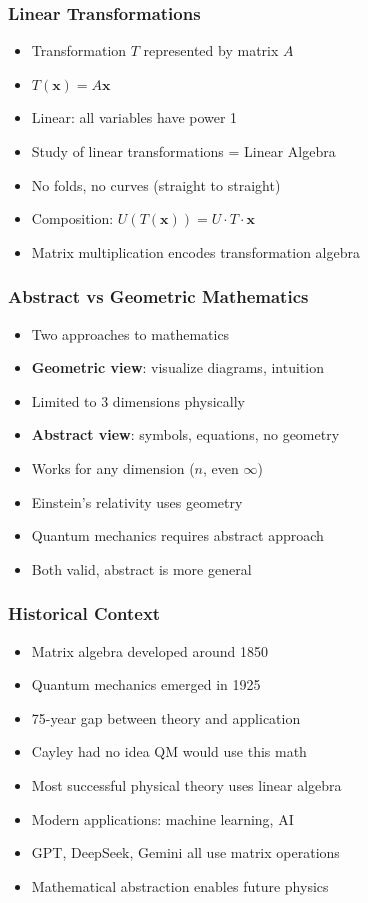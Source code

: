 \begin{frame}[fragile]\frametitle{Linear Transformations}
  \begin{itemize}
    \item Transformation $T$ represented by matrix $A$
    \item $T(\mathbf{x}) = A\mathbf{x}$
    \item Linear: all variables have power 1
    \item Study of linear transformations = Linear Algebra
    \item No folds, no curves (straight to straight)
    \item Composition: $U(T(\mathbf{x})) = U \cdot T \cdot \mathbf{x}$
    \item Matrix multiplication encodes transformation algebra
  \end{itemize}
\end{frame}

\begin{frame}[fragile]\frametitle{Abstract vs Geometric Mathematics}
  \begin{itemize}
    \item Two approaches to mathematics
    \item \textbf{Geometric view}: visualize diagrams, intuition
    \item Limited to 3 dimensions physically
    \item \textbf{Abstract view}: symbols, equations, no geometry
    \item Works for any dimension ($n$, even $\infty$)
    \item Einstein's relativity uses geometry
    \item Quantum mechanics requires abstract approach
    \item Both valid, abstract is more general
  \end{itemize}
\end{frame}

\begin{frame}[fragile]\frametitle{Historical Context}
  \begin{itemize}
    \item Matrix algebra developed around 1850
    \item Quantum mechanics emerged in 1925
    \item 75-year gap between theory and application
    \item Cayley had no idea QM would use this math
    \item Most successful physical theory uses linear algebra
    \item Modern applications: machine learning, AI
    \item GPT, DeepSeek, Gemini all use matrix operations
    \item Mathematical abstraction enables future physics
  \end{itemize}
\end{frame}

